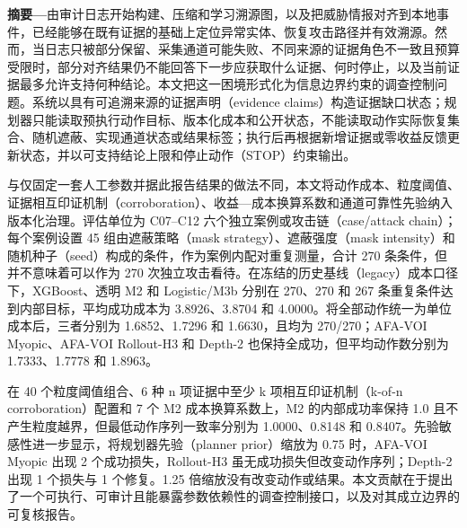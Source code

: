 \documentclass[UTF8,a4paper,twocolumn,zihao=5,fontset=fandol]{ctexart}
\begin{document}
\pagestyle{empty}


\noindent\textbf{摘要—}由审计日志开始构建、压缩和学习溯源图，以及把威胁情报对齐到本地事件，已经能够在既有证据的基础上定位异常实体、恢复攻击路径并有效溯源。然而，当日志只被部分保留、采集通道可能失败、不同来源的证据角色不一致且预算受限时，部分对齐结果仍不能回答下一步应获取什么证据、何时停止，以及当前证据最多允许支持何种结论。本文把这一困境形式化为信息边界约束的调查控制问题。系统以具有可追溯来源的证据声明（evidence claims）构造证据缺口状态；规划器只能读取预执行动作目标、版本化成本和公开状态，不能读取动作实际恢复集合、随机遮蔽、实现通道状态或结果标签；执行后再根据新增证据或零收益反馈更新状态，并以可支持结论上限和停止动作（STOP）约束输出。

与仅固定一套人工参数并据此报告结果的做法不同，本文将动作成本、粒度阈值、证据相互印证机制（corroboration）、收益—成本换算系数和通道可靠性先验纳入版本化治理。评估单位为 C07--C12 六个独立案例或攻击链（case/attack chain）；每个案例设置 45 组由遮蔽策略（mask strategy）、遮蔽强度（mask intensity）和随机种子（seed）构成的条件，作为案例内配对重复测量，合计 270 条条件，但并不意味着可以作为 270 次独立攻击看待。在冻结的历史基线（legacy）成本口径下，XGBoost、透明 M2 和 Logistic/M3b 分别在 270、270 和 267 条重复条件达到内部目标，平均成功成本为 3.8926、3.8704 和 4.0000。将全部动作统一为单位成本后，三者分别为 1.6852、1.7296 和 1.6630，且均为 270/270；AFA-VOI Myopic、AFA-VOI Rollout-H3 和 Depth-2 也保持全成功，但平均动作数分别为 1.7333、1.7778 和 1.8963。

在 40 个粒度阈值组合、6 种 n 项证据中至少 k 项相互印证机制（k-of-n corroboration）配置和 7 个 M2 成本换算系数上，M2 的内部成功率保持 1.0 且不产生粒度越界，但最低动作序列一致率分别为 1.0000、0.8148 和 0.8407。先验敏感性进一步显示，将规划器先验（planner prior）缩放为 0.75 时，AFA-VOI Myopic 出现 2 个成功损失，Rollout-H3 虽无成功损失但改变动作序列；Depth-2 出现 1 个损失与 1 个修复。1.25 倍缩放没有改变动作或结果。本文贡献在于提出了一个可执行、可审计且能暴露参数依赖性的调查控制接口，以及对其成立边界的可复核报告。
\end{document}
